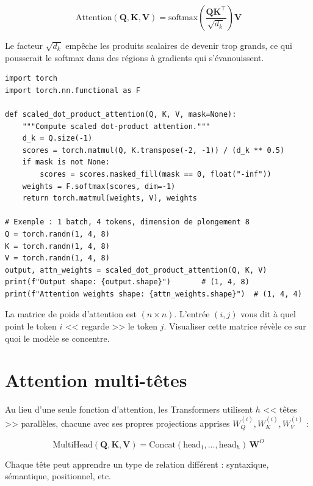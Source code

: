 \[
\text{Attention}(\mathbf{Q}, \mathbf{K}, \mathbf{V}) = \text{softmax}\!\left(\frac{\mathbf{Q}\mathbf{K}^\top}{\sqrt{d_k}}\right)\mathbf{V}
\]

Le facteur $\sqrt{d_k}$ emp\^eche les produits scalaires de devenir trop grands, ce qui pousserait le softmax dans des r\'egions \`a gradients qui s'\'evanouissent.

\begin{verbatim}
import torch
import torch.nn.functional as F

def scaled_dot_product_attention(Q, K, V, mask=None):
    """Compute scaled dot-product attention."""
    d_k = Q.size(-1)
    scores = torch.matmul(Q, K.transpose(-2, -1)) / (d_k ** 0.5)
    if mask is not None:
        scores = scores.masked_fill(mask == 0, float("-inf"))
    weights = F.softmax(scores, dim=-1)
    return torch.matmul(weights, V), weights

# Exemple : 1 batch, 4 tokens, dimension de plongement 8
Q = torch.randn(1, 4, 8)
K = torch.randn(1, 4, 8)
V = torch.randn(1, 4, 8)
output, attn_weights = scaled_dot_product_attention(Q, K, V)
print(f"Output shape: {output.shape}")       # (1, 4, 8)
print(f"Attention weights shape: {attn_weights.shape}")  # (1, 4, 4)
\end{verbatim}

\begin{aitip}
La matrice de poids d'attention est $(n \times n)$. L'entr\'ee $(i, j)$ vous dit \`a quel point le token $i$ << regarde >> le token $j$. Visualiser cette matrice r\'ev\`ele ce sur quoi le mod\`ele se concentre.
\end{aitip}

\section{Attention multi-t\^etes}

Au lieu d'une seule fonction d'attention, les Transformers utilisent $h$ << t\^etes >> parall\`eles, chacune avec ses propres projections apprises $W_Q^{(i)}, W_K^{(i)}, W_V^{(i)}$ :

\[
\text{MultiHead}(\mathbf{Q}, \mathbf{K}, \mathbf{V}) = \text{Concat}(\text{head}_1, \ldots, \text{head}_h)\,\mathbf{W}^O
\]

Chaque t\^ete peut apprendre un type de relation diff\'erent : syntaxique, s\'emantique, positionnel, etc.

